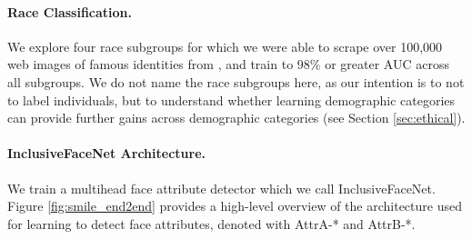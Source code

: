 \documentclass{article}
\begin{document}
\paragraph{Race Classification.}  We explore four race subgroups for which we were able to scrape over 100,000 web images of famous identities from \cite{wikidata2017,rothe2016imdbwiki,usc2017raceclassifier}, and train  %
to 98\% or greater AUC across all subgroups.  We do not name the race subgroups here, as our intention is to not to label individuals, but to understand whether learning demographic categories can provide further gains across demographic categories (see Section \ref{sec:ethical}).\vspace{-1em}

\paragraph{InclusiveFaceNet Architecture.} %
We train a multihead face attribute detector which we call InclusiveFaceNet.  Figure \ref{fig:smile_end2end} provides a high-level overview of the architecture used for learning to detect face attributes, denoted with AttrA-* and AttrB-*.\vspace{-1em}%


\end{document}
